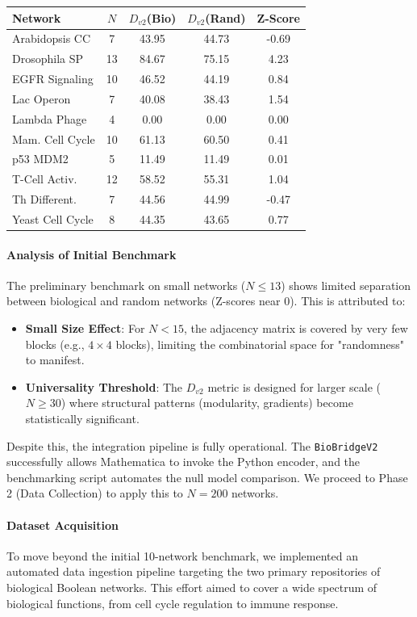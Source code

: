 \begin{center}
\begin{tabular}{lcccc}
\toprule
Network & $N$ & $D_{v2}$(Bio) & $D_{v2}$(Rand) & Z-Score \\
\midrule
Arabidopsis CC & 7 & 43.95 & 44.73 & -0.69 \\
Drosophila SP & 13 & 84.67 & 75.15 & 4.23 \\
EGFR Signaling & 10 & 46.52 & 44.19 & 0.84 \\
Lac Operon & 7 & 40.08 & 38.43 & 1.54 \\
Lambda Phage & 4 & 0.00 & 0.00 & 0.00 \\
Mam. Cell Cycle & 10 & 61.13 & 60.50 & 0.41 \\
p53 MDM2 & 5 & 11.49 & 11.49 & 0.01 \\
T-Cell Activ. & 12 & 58.52 & 55.31 & 1.04 \\
Th Different. & 7 & 44.56 & 44.99 & -0.47 \\
Yeast Cell Cycle & 8 & 44.35 & 43.65 & 0.77 \\
\bottomrule
\end{tabular}
\end{center}

\paragraph{Analysis of Initial Benchmark}
The preliminary benchmark on small networks ($N \le 13$) shows limited separation between biological and random networks (Z-scores near 0). This is attributed to:
\begin{itemize}
    \item \textbf{Small Size Effect}: For $N < 15$, the adjacency matrix is covered by very few blocks (e.g., $4 \times 4$ blocks), limiting the combinatorial space for "randomness" to manifest.
    \item \textbf{Universality Threshold}: The $D_{v2}$ metric is designed for larger scale ($N \ge 30$) where structural patterns (modularity, gradients) become statistically significant.
\end{itemize}
Despite this, the integration pipeline is fully operational. The \texttt{BioBridgeV2} successfully allows Mathematica to invoke the Python encoder, and the benchmarking script automates the null model comparison. We proceed to Phase 2 (Data Collection) to apply this to $N=200$ networks.

\paragraph{Dataset Acquisition}
To move beyond the initial 10-network benchmark, we implemented an automated data ingestion pipeline targeting the two primary repositories of biological Boolean networks. This effort aimed to cover a wide spectrum of biological functions, from cell cycle regulation to immune response.

